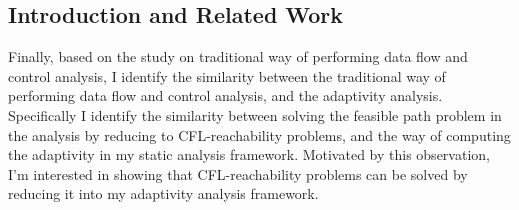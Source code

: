 \subsection{Introduction and Related Work}
\label{subsec:cfl-backgroung}
Finally, based on the study on traditional way of performing data flow and control analysis,
   I identify the similarity between the traditional way of performing data flow and control analysis, and the 
   adaptivity analysis.  
   Specifically I identify the similarity between 
   solving the feasible path problem in the analysis by reducing to CFL-reachability problems,
   and the way of computing the adaptivity in my static analysis framework.
   Motivated by this observation, 
   I'm interested in showing that
   CFL-reachability problems can be solved by reducing it into my adaptivity analysis framework.

